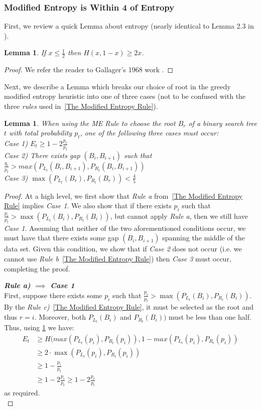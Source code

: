 \documentclass[]{beamer}
\theoremstyle{plain}
\newtheorem{lem}[thm]{Lemma}
\begin{document}
\begin{frame} \frametitle{Modified Entropy is Within 4 of Entropy}

First, we review a quick Lemma about entropy (nearly identical to Lemma 2.3 in \cite{bayer1975improved}).

\begin{lem}\label{entr2x}
If $x \leq \frac{1}{2}$ then $H(x, 1-x) \geq 2x$.
\end{lem}
\begin{proof}
We refer the reader to Gallager's 1968 work \cite{gallager1968information}.
\end{proof}

Next, we describe a Lemma which breaks our choice of root in the greedy modified entropy heuristic into one of three cases (not to be confused with the three \textit{rules} used in~\ref{The Modified Entropy Rule}). 

\begin{lem}\label{MECases}
When using the ME Rule to choose the root $B_r$ of a binary search tree $t$ with total probability $p_t$, one of the following three cases must occur: \\
\textit{Case 1)} $E_t \geq 1-2 \frac{p_r}{p_t}$ \\
\textit{Case 2)} There exists gap $(B_i, B_{i+1})$ such that $\frac{q_i}{p_t} > max(P_{L_t}(B_i, B_{i+1}), P_{R_t}(B_i, B_{i+1}))$\\
\textit{Case 3)}  $\max(P_{L_t}(B_r), P_{R_t}(B_r)) < \frac{4}{5}$\\
\end{lem}
\begin{proof} At a high level, we first show that \textit{Rule a} from~\ref{The Modified Entropy Rule} implies \textit{Case 1}. We also show that if there exists $p_i$ such that $\frac{p_i}{p_t} > \max(P_{L_t}(B_i), P_{R_t}(B_i))$, but cannot apply \textit{Rule a}, then we still have \textit{Case 1}. Assuming that neither of the two aforementioned conditions occur, we must have that there exists some gap $(B_i, B_{i+1})$ spanning the middle of the data set. Given this condition, we show that if \textit{Case 2} does not occur (i.e. we cannot use \textit{Rule b}~\ref{The Modified Entropy Rule}) then \textit{Case 3} must occur, completing the proof. 


\noindent\textbf{\textit{Rule a) $\implies$ Case 1}} \\
 First, suppose there exists some $p_i$ such that $\frac{p_i}{p_t} > \max(P_{L_t}(B_i), P_{R_t}(B_i))$. By the \textit{Rule c)}~\ref{The Modified Entropy Rule}, it must be selected as the root and thus $r=i$. Moreover, both $P_{L_t}(B_i)$ and $P_{R_t}(B_i))$ must be less than one half. Thus, using \ref{entr2x} we have: 
\begin{align*}
E_t &\geq H( max(P_{L_t}(p_i), P_{R_t}(p_i)), 1-max(P_{L_t}(p_i), P_{R_t}(p_i)) \\
 &\geq 2\cdot \max(P_{L_t}(p_i), P_{R_t}(p_i)) \\  &\geq 1-\frac{p_i}{p_t} \\ 
 &\geq 1-2 \frac{p_i}{p_t} \geq 1-2 \frac{p_r}{p_t} 
\end{align*}
 as required. \\
 

\end{proof}
\end{frame}
\end{document}
